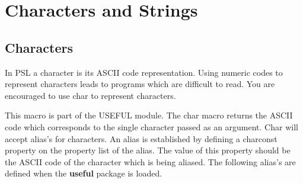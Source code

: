 \chapter*{Characters and Strings}

\section{Characters}

  In  PSL  a  character is its ASCII code representation.  Using
numeric codes to represent characters leads  to  programs  which
are  difficult  to  read.    You  are  encouraged to use char to
represent characters.


{    This macro is part of the USEFUL module.    The  char  macro
    returns  the  ASCII  code  which  corresponds  to the single
    character passed as an argument.  Char will  accept  alias's
    for  characters.    An  alias  is  established by defining a
    charconst property on the property list of the alias.    The
    value  of  this  property  should  be  the ASCII code of the
    character which is being aliased.  The following alias's are
    defined when the {\bf useful} package is loaded.
}

